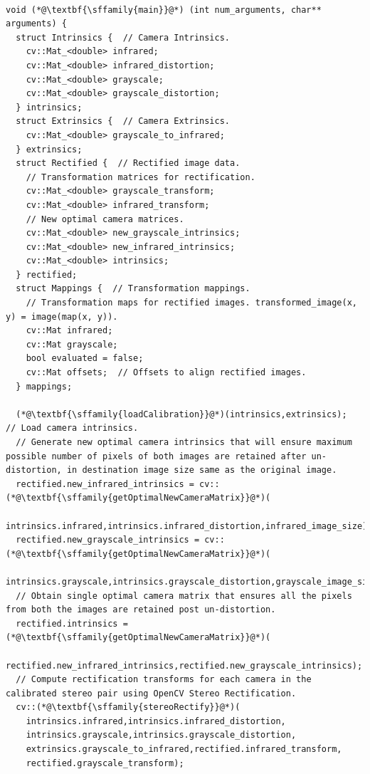 \documentclass[runningheads]{llncs}
\begin{document}
\begin{lstlisting}[caption=Pseudo source code for Image fusion, label=pseudo, frame=single]

void (*@\textbf{\sffamily{main}}@*) (int num_arguments, char** arguments) {
  struct Intrinsics {  // Camera Intrinsics.
    cv::Mat_<double> infrared;
    cv::Mat_<double> infrared_distortion;
    cv::Mat_<double> grayscale;
    cv::Mat_<double> grayscale_distortion;
  } intrinsics;
  struct Extrinsics {  // Camera Extrinsics.
    cv::Mat_<double> grayscale_to_infrared;
  } extrinsics;
  struct Rectified {  // Rectified image data.
    // Transformation matrices for rectification.
    cv::Mat_<double> grayscale_transform;
    cv::Mat_<double> infrared_transform;
    // New optimal camera matrices.
    cv::Mat_<double> new_grayscale_intrinsics; 
    cv::Mat_<double> new_infrared_intrinsics;
    cv::Mat_<double> intrinsics;
  } rectified;
  struct Mappings {  // Transformation mappings.
    // Transformation maps for rectified images. transformed_image(x, y) = image(map(x, y)).
    cv::Mat infrared;
    cv::Mat grayscale;
    bool evaluated = false;
    cv::Mat offsets;  // Offsets to align rectified images.
  } mappings;

  (*@\textbf{\sffamily{loadCalibration}}@*)(intrinsics,extrinsics);  // Load camera intrinsics.
  // Generate new optimal camera intrinsics that will ensure maximum possible number of pixels of both images are retained after un-distortion, in destination image size same as the original image.
  rectified.new_infrared_intrinsics = cv::(*@\textbf{\sffamily{getOptimalNewCameraMatrix}}@*)(
    intrinsics.infrared,intrinsics.infrared_distortion,infrared_image_size);
  rectified.new_grayscale_intrinsics = cv::(*@\textbf{\sffamily{getOptimalNewCameraMatrix}}@*)(
    intrinsics.grayscale,intrinsics.grayscale_distortion,grayscale_image_size);
  // Obtain single optimal camera matrix that ensures all the pixels from both the images are retained post un-distortion.
  rectified.intrinsics = (*@\textbf{\sffamily{getOptimalNewCameraMatrix}}@*)(
    rectified.new_infrared_intrinsics,rectified.new_grayscale_intrinsics);
  // Compute rectification transforms for each camera in the calibrated stereo pair using OpenCV Stereo Rectification.
  cv::(*@\textbf{\sffamily{stereoRectify}}@*)(
    intrinsics.infrared,intrinsics.infrared_distortion,
    intrinsics.grayscale,intrinsics.grayscale_distortion,
    extrinsics.grayscale_to_infrared,rectified.infrared_transform,
    rectified.grayscale_transform);


\end{lstlisting}
\end{document}
